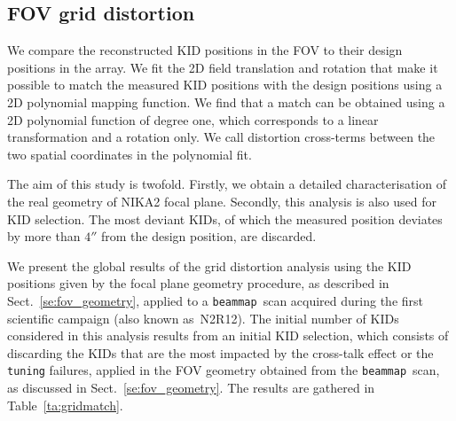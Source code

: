 \documentclass[traditionalabstract]{aa}
\newcommand{\bm}{{\tt beammap}}
\newcommand{\lp}[1]{#1}
\begin{document}
{\subsection{FOV grid distortion}
\label{se:grid_distortion}

We compare the reconstructed KID positions in the FOV to their design
positions in the array. We fit the 2D field translation and rotation that make it possible to
match the measured KID positions with the design positions using a 2D
polynomial mapping function. {\lp We find that a match can be
obtained using a 2D polynomial function of degree one, which corresponds to a linear
transformation and a rotation only.} We call distortion cross-terms
between the two spatial coordinates in the polynomial fit.

The aim of this study is twofold. Firstly, we obtain a detailed
characterisation of the real geometry of NIKA2 focal plane. Secondly,
{\lp this analysis is also used for KID
selection}. The most deviant KIDs, of which the measured position deviates
by more than $4''$ from the design position, are discarded. 

We present the global results of the grid distortion
analysis using the KID positions given
by the focal plane geometry procedure, as described in
Sect.~\ref{se:fov_geometry}, applied to a \bm\ scan acquired
during the first scientific campaign (also known as\ N2R12). 
The initial
number of KIDs considered in this analysis results from
an initial KID selection, which consists of discarding the KIDs that are the most
impacted by the cross-talk effect or the {\tt tuning} failures,
applied in the FOV geometry obtained from the \bm\ scan, as discussed in Sect.~\ref{se:fov_geometry}. %
The results are gathered in Table~\ref{ta:gridmatch}.

}
\end{document}

